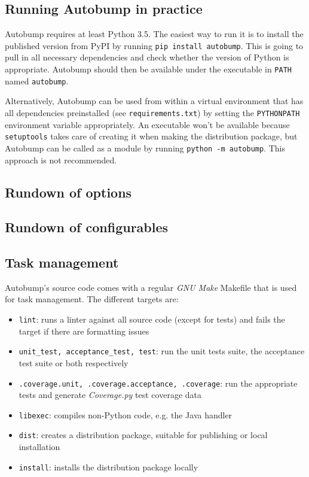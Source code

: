\documentclass{l4proj}
\newcommand\genericstyle{\lstset{basicstyle=\ttm}}
\newcommand\codeinline[1]{{\genericstyle\lstinline!#1!}}
\begin{document}
\begin{appendices}

\chapter{Running Autobump in practice}
\label{AutobumpInPractice}

Autobump requires at least Python 3.5. The easiest way to run it is to
install the published version from PyPI by running \codeinline{pip
install autobump}. This is going to pull in all necessary dependencies
and check whether the version of Python is appropriate. Autobump
should then be available under the executable in \codeinline{PATH}
named \codeinline{autobump}.

Alternatively, Autobump can be used from within a virtual environment
that has all dependencies preinstalled (see
\codeinline{requirements.txt}) by setting the \codeinline{PYTHONPATH}
environment variable appropriately. An executable won't be available
because \codeinline{setuptools} takes care of creating it when making
the distribution package, but Autobump can be called as a module by
running \codeinline{python -m autobump}. This approach is not recommended.

\section{Rundown of options}
\label{RundownOptions}

\section{Rundown of configurables}
\label{RundownConfigurables}

\section{Task management}

Autobump's source code comes with a regular \textit{GNU Make} Makefile
that is used for task management. The different targets are:

\begin{itemize}
\item \codeinline{lint}: runs a linter against all source code (except
for tests) and fails the target if there are formatting issues
\item \codeinline{unit_test, acceptance_test, test}: run the unit
tests suite, the acceptance test suite or both respectively
\item \codeinline{.coverage.unit, .coverage.acceptance, .coverage}:
run the appropriate tests and generate \textit{Coverage.py}
\cite{Coverage} test coverage data
\item \codeinline{libexec}: compiles non-Python code, e.g. the Java handler
\item \codeinline{dist}: creates a distribution package, suitable for
publishing or local installation
\item \codeinline{install}: installs the distribution package locally
\end{itemize}


\end{appendices}
\end{document}

